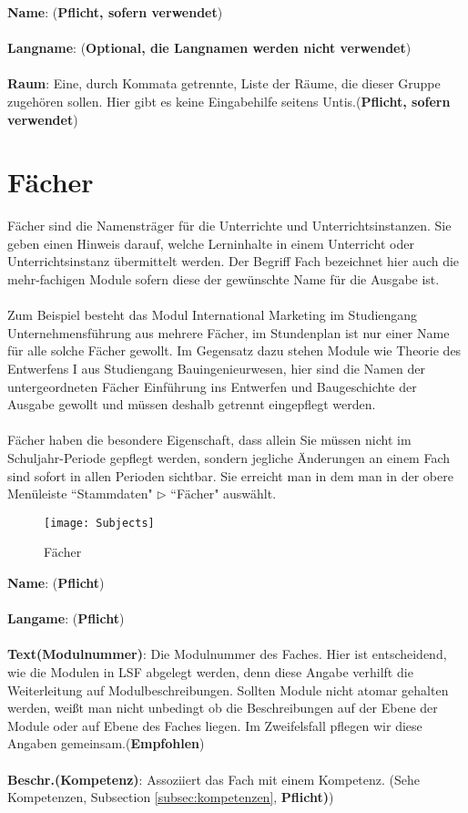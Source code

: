 \noindent
\textbf{Name}: (\textbf{Pflicht, sofern verwendet})\\
\\
\textbf{Langname}: (\textbf{Optional, die Langnamen werden nicht verwendet})\\
\\
\textbf{Raum}: Eine, durch Kommata getrennte, Liste der Räume, die dieser Gruppe zugehören sollen. Hier gibt es keine Eingabehilfe seitens Untis.(\textbf{Pflicht, sofern verwendet})\\

\newpage
\section{Fächer}

Fächer sind die Namensträger für die Unterrichte und Unterrichtsinstanzen. Sie geben einen Hinweis darauf, welche Lerninhalte in einem Unterricht oder Unterrichtsinstanz übermittelt werden. Der Begriff Fach bezeichnet hier auch die mehr-fachigen Module sofern diese der gewünschte Name für die Ausgabe ist.\\
\\
Zum Beispiel besteht das Modul International Marketing im Studiengang Unternehmensführung aus mehrere Fächer, im Stundenplan ist nur einer Name für alle solche Fächer gewollt. Im Gegensatz dazu stehen Module wie Theorie des Entwerfens I aus Studiengang Bauingenieurwesen, hier sind die Namen der untergeordneten Fächer Einführung ins Entwerfen und Baugeschichte der Ausgabe gewollt und müssen deshalb getrennt eingepflegt werden.\\
\\ 
Fächer haben die besondere Eigenschaft, dass allein Sie müssen nicht im Schuljahr-Periode gepflegt werden, sondern jegliche Änderungen an einem Fach sind sofort in allen Perioden sichtbar. Sie erreicht man in dem man in der obere Menüleiste ``Stammdaten" $\triangleright$ ``Fächer" auswählt.

\begin{figure}[h]
	\texttt{[image: Subjects]}
	\vspace{-15pt}
	\caption{Fächer}
	\label{fig:subjects}
\end{figure}

\noindent
\textbf{Name}: (\textbf{Pflicht})\\
\\
\textbf{Langame}: (\textbf{Pflicht})\\
\\
\textbf{Text(Modulnummer)}: Die Modulnummer des Faches. Hier ist entscheidend, wie die Modulen in LSF abgelegt werden, denn diese Angabe verhilft die Weiterleitung auf Modulbeschreibungen. Sollten Module nicht atomar gehalten werden, weißt man nicht unbedingt ob die Beschreibungen auf der Ebene der Module oder auf Ebene des Faches liegen. Im Zweifelsfall pflegen wir diese Angaben gemeinsam.(\textbf{Empfohlen})\\
\\
\textbf{Beschr.(Kompetenz)}: Assoziiert das Fach mit einem Kompetenz. (Sehe Kompetenzen, Subsection  \ref{subsec:kompetenzen}, \textbf{Pflicht)})

